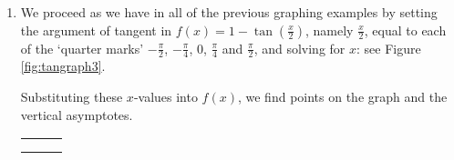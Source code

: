 \medskip

{
\begin{enumerate}

\item We proceed as we have in all of the previous graphing examples by setting the argument of tangent in $f(x) = 1 - \tan\left(\frac{x}{2}\right)$, namely $\frac{x}{2}$, equal to each of the `quarter marks' $-\frac{\pi}{2}$, $-\frac{\pi}{4}$, $0$, $\frac{\pi}{4}$ and $\frac{\pi}{2}$, and solving for $x$: see Figure \ref{fig:tangraph3}.


Substituting these $x$-values into $f(x)$, we find points on the graph and the vertical asymptotes.

\medskip

\noindent\hskip-30pt\begin{minipage}{\textwidth}
\begin{center}
\begin{tabular}{m{} m{}}
\setlength{\extrarowheight}{2pt}
\[ \begin{array}{|r||r|r|}  


\end{array}\]
\end{tabular}
\end{center}
\end{minipage}
\end{enumerate}}
